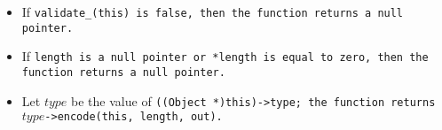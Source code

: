 \begin{itemize}

\item If \tt{validate_(this)} is \tt{false},
then the function returns a null pointer.

\item If \tt{length} is a null pointer or \tt{*length} is
equal to zero, then the function returns a null pointer.

\item Let $type$ be the value of \tt{((Object *)this)->type};
the function returns $type$\tt{->encode(this, length, out)}.

\end{itemize}
